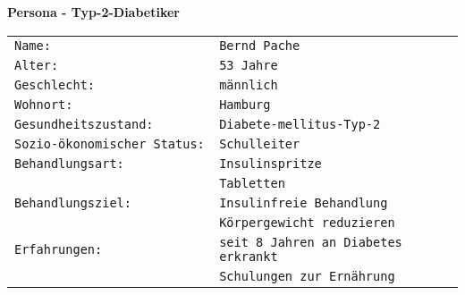 	\newpage
 \textbf{Persona - Typ-2-Diabetiker}
 \addtocounter{table}{-1}
    \begin{center}
    	\begin{longtable}[H]{p{6.6cm}p{6.6cm}}
    		\texttt{Name: }& \texttt{Bernd Pache}\\
    		\texttt{Alter: }& \texttt{53 Jahre}\\
    		\texttt{Geschlecht: }&\texttt{männlich}\\
    		\texttt{Wohnort:} & \texttt{Hamburg}\\
    		\texttt{Gesundheitszustand:} & \texttt{Diabete-mellitus-Typ-2}\\
    		\texttt{Sozio-ökonomischer Status: }& \texttt{Schulleiter}\\
    		\texttt{Behandlungsart:} & \texttt{Insulinspritze}\\
    		& \texttt{Tabletten}\\
    		\texttt{Behandlungsziel:} & \texttt{Insulinfreie Behandlung}\\
    		& \texttt{Körpergewicht reduzieren}\\
    		\texttt{Erfahrungen: }& \texttt{seit 8 Jahren an Diabetes erkrankt}\\
	   		& \texttt{Schulungen zur Ernährung}\\
	    	\end{longtable}
	    \end{center}
